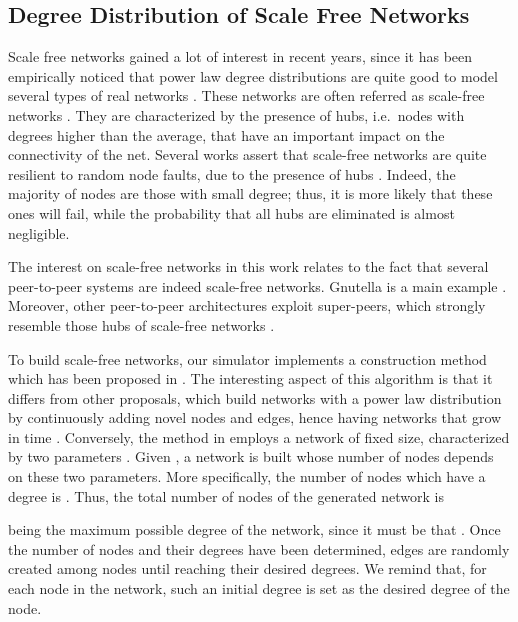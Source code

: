 \documentclass[a4paper,twosided]{article}
\begin{document}
\subsection{Degree Distribution of Scale Free Networks}

Scale free networks gained a lot of interest in recent years, since it has been empirically noticed that power law degree distributions  
are quite good to model several types of real networks \cite{Barabasi2000,Verlag03structuralproperties,Faloutsos:1999,Price:1965,Adamic03localsearch,dobrescu,conf/nca/GarbinatoRT07}.
These networks are often referred as scale-free networks \cite{Newman03thestructure,simutools}.
They are characterized by the presence of hubs, i.e.~nodes with degrees higher than the average, that have an important impact on the connectivity of the net. Several works assert that scale-free networks are quite resilient to random node faults, due to the presence of hubs \cite{2000Nature_Albert,newmanHandbook}. Indeed, the majority of nodes are those with small degree; thus, it is more likely that these ones will fail, while the probability that all hubs are eliminated is almost negligible. 


The interest on scale-free networks in this work relates to the fact that several peer-to-peer systems are indeed scale-free networks. Gnutella is a main example \cite{Adamic03localsearch}. Moreover, other peer-to-peer architectures exploit super-peers, which strongly resemble those hubs of scale-free networks \cite{cooper,garbacki,lin,pyun}.


To build scale-free networks, our simulator implements a construction method which has been proposed in \cite{Aiello00arandom}. 
The interesting aspect of this algorithm is that it differs from other proposals, which build networks with a power law distribution by continuously adding novel nodes and edges, hence having networks that grow in time
\cite{Barabasi2000,barab99}. Conversely, the method in \cite{Aiello00arandom} employs a network of fixed size, characterized by two parameters . Given , a network is built whose number of nodes depends on these two parameters. More specifically, the number of nodes  which have a degree  is . Thus, the total number of nodes of the generated network is 

being  the maximum possible degree of the network, since it must be that .
Once the number of nodes and their degrees have been determined, edges are randomly created among nodes until reaching their desired degrees.
We remind that, for each node in the network, such an initial degree is set as the desired degree  of the node.
\end{document}
